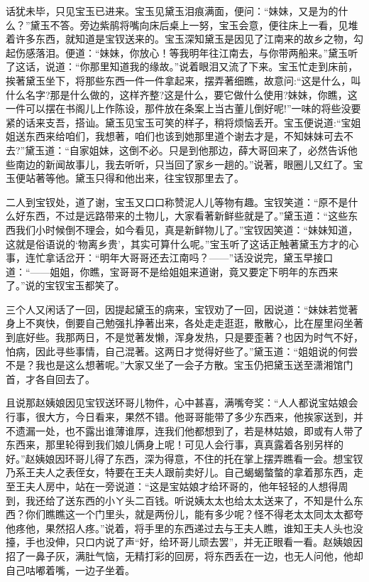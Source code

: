 \begin{parag}
    话犹未毕，只见宝玉已进来。宝玉见黛玉泪痕满面，便问：“妹妹，又是为的什么？”黛玉不答。旁边紫鹃将嘴向床后桌上一努，宝玉会意，便往床上一看，见堆着许多东西，就知道是宝钗送来的。宝玉深知黛玉是因见了江南来的故乡之物，勾起伤感落泪。便道：“妹妹，你放心！等我明年往江南去，与你带两船来。”黛玉听了这话，说道：“你那里知道我的缘故。”说着眼泪又流了下来。宝玉忙走到床前，挨著黛玉坐下，将那些东西一件一件拿起来，摆弄著细瞧，故意问:“这是什么，叫什么名字?那是什么做的，这样齐整?这是什么，要它做什么使用?妹妹，你瞧，这一件可以摆在书阁儿上作陈设，那件放在条案上当古董儿倒好呢!”一味的将些没要紧的话来支吾，搭讪。黛玉见宝玉可笑的样子，稍将烦恼丢开。宝玉便说道:“宝姐姐送东西来给咱们，我想著，咱们也该到她那里道个谢去才是，不知妹妹可去不去?”黛玉道：“自家姐妹，这倒不必。只是到他那边，薛大哥回来了，必然告诉他些南边的新闻故事儿，我去听听，只当回了家乡一趟的。”说著，眼圈儿又红了。宝玉便站著等他。黛玉只得和他出来，往宝钗那里去了。
\end{parag}


\begin{parag}
    二人到宝钗处，道了谢，宝玉又口口称赞泥人儿等物有趣。宝钗笑道：“原不是什么好东西，不过是远路带来的土物儿，大家看著新鲜些就是了。”黛玉道：“这些东西我们小时候倒不理会，如今看见，真是新鲜物儿了。”宝钗因笑道：“妹妹知道，这就是俗语说的‘物离乡贵’，其实可算什么呢。”宝玉听了这话正触著黛玉方才的心事，连忙拿话岔开：“明年大哥哥还去江南吗？——”话没说完，黛玉早接口道：“——姐姐，你瞧，宝哥哥不是给姐姐来道谢，竟又要定下明年的东西来了。”说的宝钗宝玉都笑了。
\end{parag}


\begin{parag}
    三个人又闲话了一回，因提起黛玉的病来，宝钗劝了一回，因说道：“妹妹若觉著身上不爽快，倒要自己勉强扎挣著出来，各处走走逛逛，散散心，比在屋里闷坐著到底好些。我那两日，不是觉著发懒，浑身发热，只是要歪著？也因为时气不好，怕病，因此寻些事情，自己混著。这两日才觉得好些了。”黛玉道：“姐姐说的何尝不是？我也是这么想著呢。”大家又坐了一会子方散。宝玉仍把黛玉送至潇湘馆门首，才各自回去了。
\end{parag}


\begin{parag}
    且说那赵姨娘因见宝钗送环哥儿物件，心中甚喜，满嘴夸奖：“人人都说宝姑娘会行事，很大方，今日看来，果然不错。他哥哥能带了多少东西来，他挨家送到，并不遗漏一处，也不露出谁薄谁厚，连我们他都想到了，若是林姑娘，即或有人带了东西来，那里轮得到我们娘儿俩身上呢！可见人会行事，真真露着各别另样的好。”赵姨娘因环哥儿得了东西，深为得意，不住的托在掌上摆弄瞧看一会。想宝钗乃系王夫人之表侄女，特要在王夫人跟前卖好儿。自己蝎蝎螫螫的拿着那东西，走至王夫人房中，站在一旁说道：“这是宝姑娘才给环哥的，他年轻轻的人想得周到，我还给了送东西的小ㄚ头二百钱。听说姨太太也给太太送来了，不知是什么东西？你们瞧瞧这一个门里头，就是两份儿，能有多少呢？怪不得老太太同太太都夸他疼他，果然招人疼。”说着，将手里的东西递过去与王夫人瞧，谁知王夫人头也没擡，手也没伸，只口内说了声“好，给环哥儿顽去罢”，并无正眼看一看。赵姨娘因招了一鼻子灰，满肚气恼，无精打彩的回房，将东西丢在一边，也无人问他，他却自己咕嘟着嘴，一边子坐着。
\end{parag}


